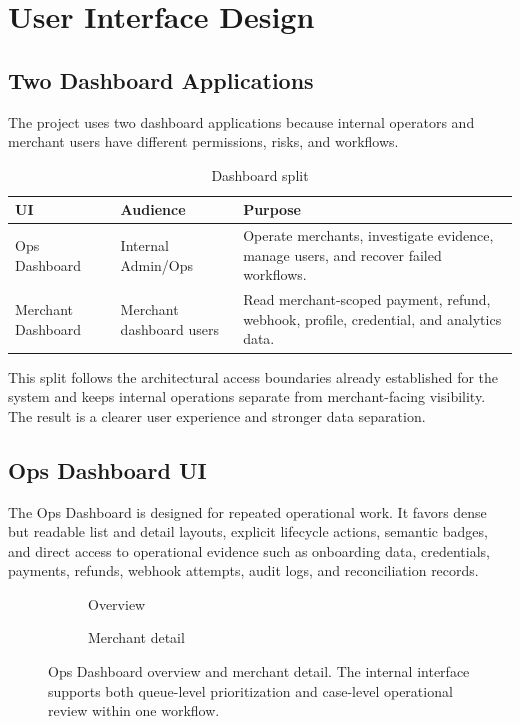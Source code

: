 \chapter{User Interface Design}

\section{Two Dashboard Applications}

The project uses two dashboard applications because internal operators and
merchant users have different permissions, risks, and workflows.

\begin{table}[!htbp]
\centering
\caption{Dashboard split}
\begin{tabularx}{\textwidth}{L{0.24\textwidth}L{0.24\textwidth}Y}
\toprule
\textbf{UI} & \textbf{Audience} & \textbf{Purpose} \\
\midrule
Ops Dashboard & Internal Admin/Ops & Operate merchants, investigate evidence, manage users, and recover failed workflows. \\
\bodyrowrule
Merchant Dashboard & Merchant dashboard users & Read merchant-scoped payment, refund, webhook, profile, credential, and analytics data. \\
\bottomrule
\end{tabularx}
\end{table}

This split follows the architectural access boundaries already established for
the system and keeps internal operations separate from merchant-facing
visibility. The result is a clearer user experience and stronger data
separation.

\section{Ops Dashboard UI}

The Ops Dashboard is designed for repeated operational work. It favors dense but
readable list and detail layouts, explicit lifecycle actions, semantic badges,
and direct access to operational evidence such as onboarding data, credentials,
payments, refunds, webhook attempts, audit logs, and reconciliation records.

\begin{figure}[!htbp]
\centering
\begin{subfigure}[t]{0.62\textwidth}
  \centering
  \caption{Overview}
\end{subfigure}
\hfill
\begin{subfigure}[t]{0.32\textwidth}
  \centering
  \caption{Merchant detail}
\end{subfigure}
\caption{Ops Dashboard overview and merchant detail. The internal interface
supports both queue-level prioritization and case-level operational review
within one workflow.}
\end{figure}

